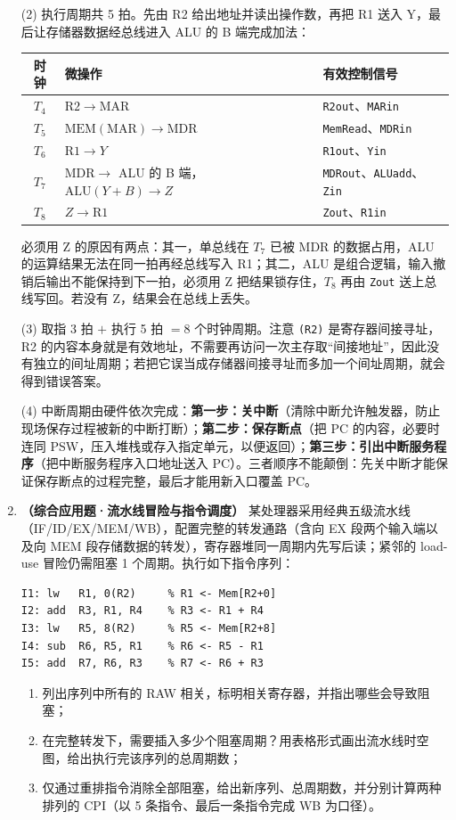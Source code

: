 \begin{enumerate}[resume]
(2) 执行周期共 5 拍。先由 R2 给出地址并读出操作数，再把 R1 送入 Y，最后让存储器数据经总线进入 ALU 的 B 端完成加法：
\begin{center}
\small
\begin{tabular}{cll}
\hline
时钟 & 微操作 & 有效控制信号 \\
\hline
$T_4$ & $\mathrm{R2}\to\mathrm{MAR}$ & \texttt{R2out}、\texttt{MARin} \\
$T_5$ & $\mathrm{MEM}(\mathrm{MAR})\to\mathrm{MDR}$ & \texttt{MemRead}、\texttt{MDRin} \\
$T_6$ & $\mathrm{R1}\to Y$ & \texttt{R1out}、\texttt{Yin} \\
$T_7$ & $\mathrm{MDR}\to$ ALU 的 B 端，$\mathrm{ALU}(Y+B)\to Z$ & \texttt{MDRout}、\texttt{ALUadd}、\texttt{Zin} \\
$T_8$ & $Z\to\mathrm{R1}$ & \texttt{Zout}、\texttt{R1in} \\
\hline
\end{tabular}
\end{center}
必须用 Z 的原因有两点：其一，单总线在 $T_7$ 已被 MDR 的数据占用，ALU 的运算结果无法在同一拍再经总线写入 R1；其二，ALU 是组合逻辑，输入撤销后输出不能保持到下一拍，必须用 Z 把结果锁存住，$T_8$ 再由 \texttt{Zout} 送上总线写回。若没有 Z，结果会在总线上丢失。

(3) 取指 3 拍 $+$ 执行 5 拍 $=8$ 个时钟周期。注意 \texttt{(R2)} 是寄存器间接寻址，R2 的内容本身就是有效地址，不需要再访问一次主存取“间接地址”，因此没有独立的间址周期；若把它误当成存储器间接寻址而多加一个间址周期，就会得到错误答案。

(4) 中断周期由硬件依次完成：\textbf{第一步：关中断}（清除中断允许触发器，防止现场保存过程被新的中断打断）；\textbf{第二步：保存断点}（把 PC 的内容，必要时连同 PSW，压入堆栈或存入指定单元，以便返回）；\textbf{第三步：引出中断服务程序}（把中断服务程序入口地址送入 PC）。三者顺序不能颠倒：先关中断才能保证保存断点的过程完整，最后才能用新入口覆盖 PC。

\else \answerarea[12] \fi

\item \textbf{（综合应用题·流水线冒险与指令调度）} 某处理器采用经典五级流水线（IF/ID/EX/MEM/WB），配置完整的转发通路（含向 EX 段两个输入端以及向 MEM 段存储数据的转发），寄存器堆同一周期内先写后读；紧邻的 load-use 冒险仍需阻塞 1 个周期。执行如下指令序列：
\begin{lstlisting}
I1: lw   R1, 0(R2)     % R1 <- Mem[R2+0]
I2: add  R3, R1, R4    % R3 <- R1 + R4
I3: lw   R5, 8(R2)     % R5 <- Mem[R2+8]
I4: sub  R6, R5, R1    % R6 <- R5 - R1
I5: add  R7, R6, R3    % R7 <- R6 + R3
\end{lstlisting}
\begin{enumerate}
    \item[(1)] 列出序列中所有的 RAW 相关，标明相关寄存器，并指出哪些会导致阻塞；
    \item[(2)] 在完整转发下，需要插入多少个阻塞周期？用表格形式画出流水线时空图，给出执行完该序列的总周期数；
    \item[(3)] 仅通过重排指令消除全部阻塞，给出新序列、总周期数，并分别计算两种排列的 CPI（以 5 条指令、最后一条指令完成 WB 为口径）。
\end{enumerate}


\end{enumerate}

